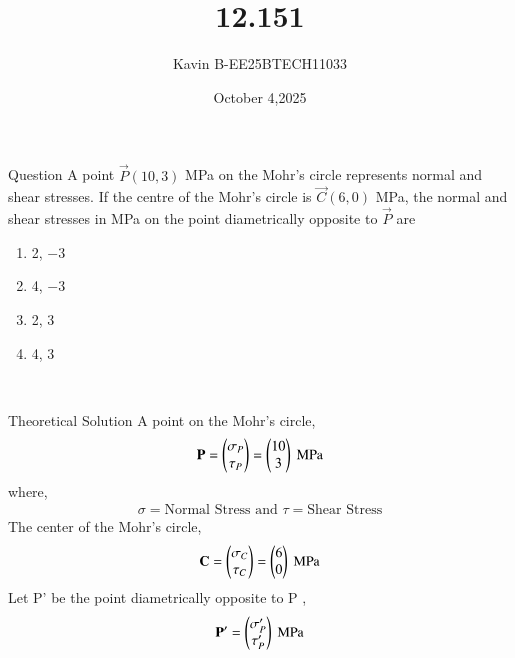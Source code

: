\documentclass{beamer}
\begin{document}
\title 
{12.151}
\date{October 4,2025}


\author 
{Kavin B-EE25BTECH11033}






\frame{\titlepage}
\begin{frame}{Question}
A point $\vec{P}(10,3)$ MPa on the Mohr's circle represents normal and shear stresses. If the centre of the Mohr's circle is $\vec{C}(6,0)$ MPa, the normal and shear stresses in MPa on the point diametrically opposite to $\vec{P}$ are

\begin{enumerate}

    \item 2, $-3$
    \item 4, $-3$
    \item 2, 3
    \item 4, 3

\end{enumerate}\\    
\bigskip
\end{frame}



\begin{frame}{Theoretical Solution}
A point on the Mohr's circle, 
\begin{align}
    \mathbf{P} = \begin{pmatrix}\sigma_P\\ \tau_P\end{pmatrix} = \begin{pmatrix}10\\3\end{pmatrix} \text{ MPa}
\end{align}
where,
\begin{align*}
    \sigma = \text{Normal Stress} \text{ and } \tau = \text{Shear Stress}
\end{align*}
The center of the Mohr's circle,
\begin{align}
    \mathbf{C} = \begin{pmatrix}\sigma_C\\ \tau_C\end{pmatrix} = \begin{pmatrix}6\\0\end{pmatrix} \text{ MPa}
\end{align}
Let P' be the point diametrically opposite to P ,
\begin{align}
    \mathbf{P'} = \begin{pmatrix}\sigma_P'\\ \tau_P'\end{pmatrix} \text{ MPa}
\end{align}
\end{frame}
\end{document}
